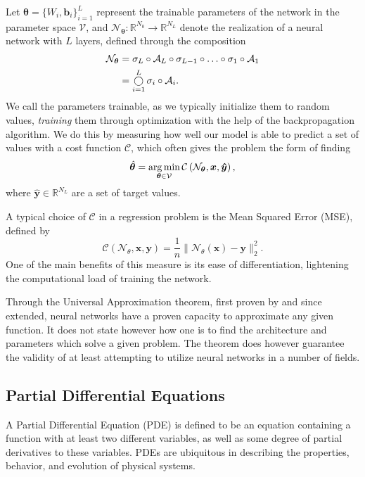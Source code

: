 Let $\boldsymbol{\theta} = \{ W_i, \boldsymbol{b}_i \}_{i = 1}^L$ represent the trainable parameters of the network in the parameter space $\mathcal{V}$, and $\mathcal{N}_{\boldsymbol{\theta}} : \mathbb{R}^{N_0} \to \mathbb{R}^{N_L}$ denote the realization of a neural network with $L$ layers, defined through the composition
\begin{equation}\label{eq:NNreal}
\begin{split}
    \mathcal{N}_{\boldsymbol{\theta}} &= \sigma_L \circ \mathcal{A}_L \circ \sigma_{L-1} \circ \ldots \circ \sigma_{1} \circ \mathcal{A}_1 \\
    &= \operatorname*{\bigcirc}_{i = 1}^L \sigma_i \circ \mathcal{A}_i.
\end{split}
\end{equation}
We call the parameters trainable, as we typically initialize them to random values, \textit{training} them through optimization with the help of the backpropagation algorithm.
We do this by measuring how well our model is able to predict a set of values with a cost function $\mathcal{C}$, which often gives the problem the form of finding
\begin{equation}\label{eq:argmintheta}
    \hat{\boldsymbol{\theta}} = \operatorname*{arg\,min}_{\boldsymbol{\theta} \in \mathcal{V}} \mathcal{C} \left( \mathcal{N}_{\boldsymbol{\theta}}, \boldsymbol{x}, \boldsymbol{\hat{y}} \right),
\end{equation}
where $\boldsymbol{\hat{y}} \in \mathbb{R}^{N_L}$ are a set of target values.

A typical choice of $\mathcal{C}$ in a regression problem is the Mean Squared Error (MSE), defined by
\begin{equation}
    \mathcal{C}(\mathcal{N}_\theta, \boldsymbol{x}, \boldsymbol{y}) = \frac{1}{n} \lVert \mathcal{N}_\theta(\boldsymbol{x}) - \boldsymbol{y} \rVert_2^2.
\end{equation}
One of the main benefits of this measure is its ease of differentiation, lightening the computational load of training the network.

Through the Universal Approximation theorem, first proven by \textcite{Cybenko1989ApproximationBS} and since extended, neural networks have a proven capacity to approximate any given function.
It does not state however how one is to find the architecture and parameters which solve a given problem.
The theorem does however guarantee the validity of at least attempting to utilize neural networks in a number of fields.

\subsection{Partial Differential Equations}
A Partial Differential Equation (PDE) is defined to be an equation containing a function with at least two different variables, as well as some degree of partial derivatives to these variables.
PDEs are ubiquitous in describing the properties, behavior, and evolution of physical systems.

